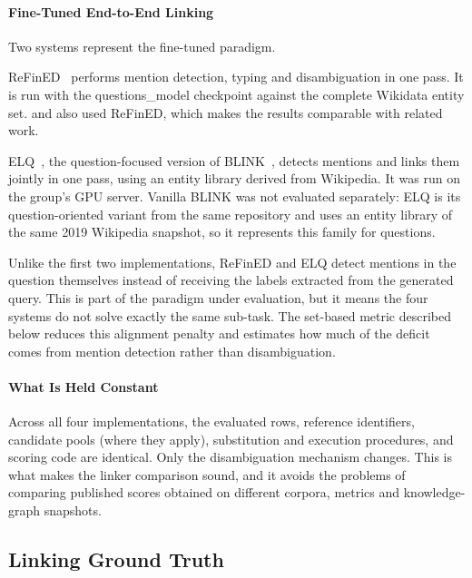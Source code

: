 \paragraph{Fine-Tuned End-to-End
Linking}

Two systems represent the fine-tuned paradigm.

ReFinED~\parencite{ayoola2022refined} performs mention detection, typing and disambiguation in one pass.
It is run with the questions\_model checkpoint against the complete Wikidata entity set.
\textcite{xu2023wikisp} and \textcite{alekseev2025querybased} also used ReFinED, which makes the results comparable with related work.

ELQ~\parencite{li2020elq}, the question-focused version of BLINK~\parencite{wu2020blink}, detects mentions and links them jointly in one pass, using an entity library derived from Wikipedia.
It was run on the group's GPU server.
Vanilla BLINK was not evaluated separately: ELQ is its question-oriented variant from the same repository and uses an entity library of the same 2019 Wikipedia snapshot, so it represents this family for questions.

Unlike the first two implementations, ReFinED and ELQ detect mentions in the question themselves instead of receiving the labels extracted from the generated query.
This is part of the paradigm under evaluation, but it means the four systems do not solve exactly the same sub-task.
The set-based metric described below reduces this alignment penalty and estimates how much of the deficit comes from mention detection rather than disambiguation.

\paragraph{What Is Held Constant}

Across all four implementations, the evaluated rows, reference identifiers, candidate pools (where they apply), substitution and execution procedures, and scoring code are identical.
Only the disambiguation mechanism changes.
This is what makes the linker comparison sound, and it avoids the problems of comparing published scores obtained on different corpora, metrics and knowledge-graph snapshots.

\subsection{Linking Ground Truth}

\label{sec:setup-groundtruth}

